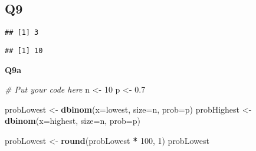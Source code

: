\documentclass[
]{article}
\newenvironment{Shaded}{\begin{snugshade}}{\end{snugshade}}
\newcommand{\AttributeTok}[1]{\textcolor[rgb]{0.13,0.29,0.53}{#1}}
\newcommand{\CommentTok}[1]{\textcolor[rgb]{0.56,0.35,0.01}{\textit{#1}}}
\newcommand{\ConstantTok}[1]{\textcolor[rgb]{0.56,0.35,0.01}{#1}}
\newcommand{\DecValTok}[1]{\textcolor[rgb]{0.00,0.00,0.81}{#1}}
\newcommand{\FloatTok}[1]{\textcolor[rgb]{0.00,0.00,0.81}{#1}}
\newcommand{\FunctionTok}[1]{\textcolor[rgb]{0.13,0.29,0.53}{\textbf{#1}}}
\newcommand{\NormalTok}[1]{#1}
\newcommand{\OtherTok}[1]{\textcolor[rgb]{0.56,0.35,0.01}{#1}}
\newcommand{\SpecialCharTok}[1]{\textcolor[rgb]{0.81,0.36,0.00}{\textbf{#1}}}
\begin{document}
\hypertarget{q9}{%
\subsection{Q9}\label{q9}}

\begin{Shaded}
\end{Shaded}

\begin{verbatim}
## [1] 3
\end{verbatim}

\begin{Shaded}
\end{Shaded}

\begin{verbatim}
## [1] 10
\end{verbatim}

\textbf{Q9a}

\begin{Shaded}
\begin{Highlighting}[]
\CommentTok{\# Put your code here}
\NormalTok{n }\OtherTok{\textless{}{-}} \DecValTok{10}
\NormalTok{p }\OtherTok{\textless{}{-}} \FloatTok{0.7}

\NormalTok{probLowest }\OtherTok{\textless{}{-}} \FunctionTok{dbinom}\NormalTok{(}\AttributeTok{x=}\NormalTok{lowest, }\AttributeTok{size=}\NormalTok{n, }\AttributeTok{prob=}\NormalTok{p)}
\NormalTok{probHighest }\OtherTok{\textless{}{-}} \FunctionTok{dbinom}\NormalTok{(}\AttributeTok{x=}\NormalTok{highest, }\AttributeTok{size=}\NormalTok{n, }\AttributeTok{prob=}\NormalTok{p)}

\NormalTok{probLowest }\OtherTok{\textless{}{-}} \FunctionTok{round}\NormalTok{(probLowest }\SpecialCharTok{*} \DecValTok{100}\NormalTok{, }\DecValTok{1}\NormalTok{)}
\NormalTok{probLowest}
\end{Highlighting}
\end{Shaded}
\end{document}
